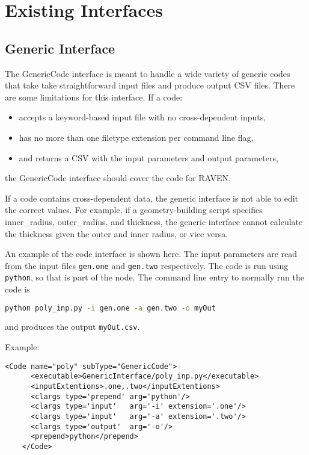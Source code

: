 \section{Existing Interfaces}
\label{sec:existingInterface}
\subsection{Generic Interface}
The GenericCode interface is meant to handle a wide variety of generic codes 
that take take straightforward input files and produce output CSV files.  There are
some limitations for this interface.  
If a code: \vspace{-20pt}
\begin{itemize}
\item accepts a keyword-based input file with no cross-dependent inputs,
\item has no more than one filetype extension per command line flag,
\item and returns a CSV with the input parameters and output parameters,
\end{itemize}\vspace{-20pt}
the GenericCode interface should cover the code for RAVEN.

If a code contains cross-dependent data, the generic interface is not able to
edit the correct values.  For example, if a geometry-building script specifies
inner\_radius, outer\_radius, and thickness, the generic interface cannot 
calculate the thickness given the outer and inner radius, or vice versa.

 An example of the code interface is shown here.  The input parameters are read 
 from the input files \texttt{gen.one} and \texttt{gen.two} respectively.
 The code is run using \texttt{python}, so that is part of the  node.
 The command line entry to normally run the code is
\begin{lstlisting}[language=bash]
python poly_inp.py -i gen.one -a gen.two -o myOut
\end{lstlisting}
and produces the output \texttt{myOut.csv}.

Example:
\begin{lstlisting}[style=XML]
    <Code name="poly" subType="GenericCode">
      <executable>GenericInterface/poly_inp.py</executable>
      <inputExtentions>.one,.two</inputExtentions>
      <clargs type='prepend' arg='python'/>
      <clargs type='input'   arg='-i' extension='.one'/>
      <clargs type='input'   arg='-a' extension='.two'/>
      <clargs type='output'  arg='-o'/>
      <prepend>python</prepend>
    </Code>
\end{lstlisting}

